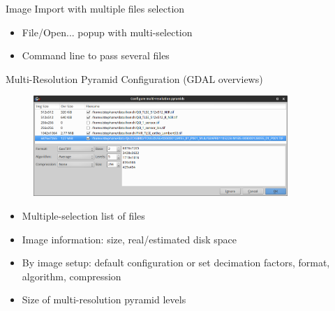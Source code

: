 \documentclass[smaller]{beamer}
\begin{document}
\begin{frame}{Image Import with multiple files selection}

\begin{itemize}
  \item File/Open... popup with multi-selection
  \item Command line to pass several files 
\end{itemize}

\end{frame} 
   
\begin{frame}{Multi-Resolution Pyramid Configuration (GDAL overviews)}   

\begin{figure}[ht]
\begin{center}
\includegraphics[height=1.5in]{images/2016-06-06_MVD_Multi-Resolution_Pyramid_configuration.png}
\end{center}
\end{figure}

\begin{itemize}
  \item Multiple-selection list of files
  \item Image information: size, real/estimated disk space
  \item By image setup: default configuration or set decimation factors, format, algorithm, compression
  \item Size of multi-resolution pyramid levels
\end{itemize}   

\end{frame}    
   
\end{document}
